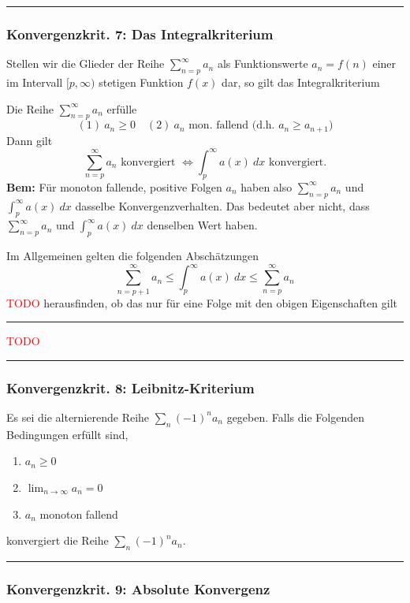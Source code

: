 \documentclass[a4paper,landscape,8pt]{extarticle}
\newcommand{\todo}{\textcolor{red}{TODO }}
\newcommand{\sep}{\vspace{5pt}\noindent\hrule\vspace{5pt}}
\newcommand{\Bem}{\textbf{Bem: }}
\begin{document}
\begin{multicols*}{4}
\sep

\subsubsection{Konvergenzkrit. 7: Das Integralkriterium}

\Satz[Integralkriterium] Stellen wir die Glieder der Reihe
$\sum_{n=p}^{\infty}a_n$ als Funktionswerte $a_n=f(n)$ einer 
im Intervall $[p,\infty)$ stetigen Funktion
$f(x)$ dar, so gilt das Integralkriterium

Die Reihe $\sum_{n=p}^{\infty}a_n$ erfülle
\[
(1) \ a_n \geq 0	\quad
(2) \ a_n \text{ mon. fallend (d.h. } a_{n} \geq a_{n+1} \text{)}
\]
Dann gilt
\[
\sum_{n=p}^{\infty}a_n \text{ konvergiert }
\Longleftrightarrow
\int_p^\infty a(x) \ dx \text{ konvergiert}.
\]
\Bem Für monoton fallende, positive Folgen $a_n$ haben also
$\sum_{n=p}^{\infty}a_n$ und $\int_p^\infty a(x) \ dx$ dasselbe
Konvergenzverhalten. Das bedeutet aber nicht, dass $\sum_{n=p}^{\infty}a_n$ und
$\int_p^\infty a(x) \ dx$ denselben Wert haben.

\Satz Im Allgemeinen gelten die folgenden Abschätzungen
\[
\sum_{n=p+1}^{\infty}a_n
\leq
\int_p^\infty a(x) \ dx
\leq 
\sum_{n=p}^{\infty}a_n
\]
\todo herausfinden, ob das nur für eine Folge mit den obigen Eigenschaften gilt
\sep

\begin{warmup}
\todo \Bsp

\sep
\end{warmup}

\subsubsection{Konvergenzkrit. 8: Leibnitz-Kriterium}

 Es sei die alternierende Reihe $\sum_n (-1)^na_n$
gegeben. Falls die Folgenden Bedingungen erfüllt sind,
\begin{enumerate}[label=(\arabic*)]
  \item $a_n\geq 0$
  \item $\lim_{n\to\infty}a_n=0$
  \item $a_n$ monoton fallend
\end{enumerate}
konvergiert die Reihe $\sum_n (-1)^na_n$.

\sep

\subsubsection{Konvergenzkrit. 9: Absolute Konvergenz}


\end{multicols*}
\end{document}

